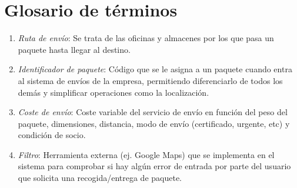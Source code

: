 \newpage

\section{Glosario de términos}
	\begin{enumerate}
		\item \textit{Ruta de envío}: Se trata de las oficinas y almacenes por los que pasa un paquete hasta llegar al destino.
		\item \textit{Identificador de paquete}: Código que se le asigna a un paquete cuando entra al sistema de envíos de la empresa, permitiendo diferenciarlo de todos los demás y simplificar operaciones como la localización.
		\item \textit{Coste de envío}: Coste variable del servicio de envío en función del peso del paquete, dimensiones, distancia, modo de envío (certificado, urgente, etc) y condición de socio.
		\item \textit{Filtro}: Herramienta externa (ej. Google Maps) que se implementa  en el sistema para comprobar si hay algún error de entrada por parte del usuario que solicita una recogida/entrega de paquete.
 	\end{enumerate}
\newpage


